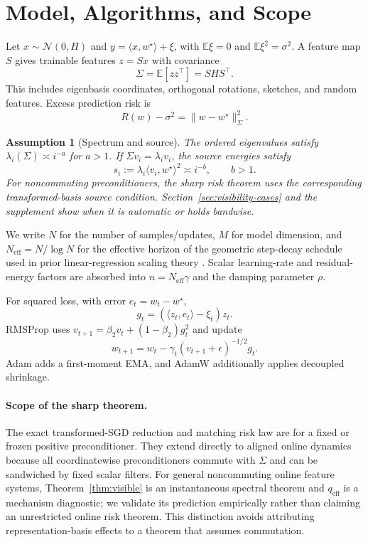 \documentclass[letterpaper]{article} %
\newtheorem{assumption}{Assumption}
\newcommand{\E}{\mathbb{E}}
\newcommand{\qeff}{q_{\mathrm{eff}}}
\newcommand{\Neff}{N_{\mathrm{eff}}}
\begin{document}
\section{Model, Algorithms, and Scope}

Let $x\sim\mathcal N(0,H)$ and $y=\langle x,w^\star\rangle+\xi$, with $\E\xi=0$ and $\E\xi^2=\sigma^2$.  A feature map $S$ gives trainable features $z=Sx$ with covariance
\[
 \Sigma=\E[zz^\top]=SHS^\top.
\]
This includes eigenbasis coordinates, orthogonal rotations, sketches, and random features.  Excess prediction risk is
\[
 R(w)-\sigma^2=\|w-w^\star\|_\Sigma^2.
\]

\begin{assumption}[Spectrum and source]
\label{ass:power}
The ordered eigenvalues satisfy $\lambda_i(\Sigma)\asymp i^{-a}$ for $a>1$.  If $\Sigma v_i=\lambda_i v_i$, the source energies satisfy
\[
 s_i:=\lambda_i\langle v_i,w^\star\rangle^2\asymp i^{-b},
 \qquad b>1.
\]
For noncommuting preconditioners, the sharp risk theorem uses the corresponding transformed-basis source condition.  Section~\ref{sec:visibility-cases} and the supplement show when it is automatic or holds bandwise.
\end{assumption}

We write $N$ for the number of samples/updates, $M$ for model dimension, and $\Neff=N/\log N$ for the effective horizon of the geometric step-decay schedule used in prior linear-regression scaling theory \cite{lin2024scaling}.  Scalar learning-rate and residual-energy factors are absorbed into $n=\Neff\gamma$ and the damping parameter $\rho$.

For squared loss, with error $e_t=w_t-w^\star$,
\[
 g_t=(\langle z_t,e_t\rangle-\xi_t)z_t.
\]
RMSProp uses $v_{t+1}=\beta_2v_t+(1-\beta_2)g_t^2$ and update
\[
 w_{t+1}=w_t-\gamma_t(v_{t+1}+\epsilon)^{-1/2}g_t.
\]
Adam adds a first-moment EMA, and AdamW additionally applies decoupled shrinkage.

\paragraph{Scope of the sharp theorem.}
The exact transformed-SGD reduction and matching risk law are for a fixed or frozen positive preconditioner.  They extend directly to aligned online dynamics because all coordinatewise preconditioners commute with $\Sigma$ and can be sandwiched by fixed scalar filters.  For general noncommuting online feature systems, Theorem~\ref{thm:visible} is an instantaneous spectral theorem and $\qeff$ is a mechanism diagnostic; we validate its prediction empirically rather than claiming an unrestricted online risk theorem.  This distinction avoids attributing representation-basis effects to a theorem that assumes commutation.
\end{document}
